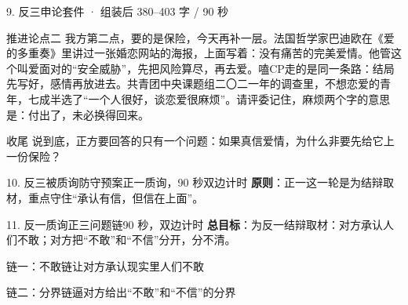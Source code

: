 \documentclass[script,con]{debate}
\begin{document}
\begin{kit}{9. 反三申论}{套件 · 组装后 380–403 字 / 90 秒}
\begin{fixed}{推进论点二}
我方第二点，要的是保险，今天再补一层。法国哲学家巴迪欧在《爱的多重奏》里讲过一张婚恋网站的海报，上面写着：没有痛苦的完美爱情。他管这个叫爱面对的“安全威胁”，先把风险算尽，再去爱。嗑CP走的是同一条路：结局先写好，感情再放进去。共青团中央课题组二〇二一年的调查里，不想恋爱的青年，七成半选了“一个人很好，谈恋爱很麻烦”。请评委记住，麻烦两个字的意思是：付出了，未必换得回来。
\end{fixed}
\begin{fixed}{收尾}
说到底，正方要回答的只有一个问题：如果真信爱情，为什么非要先给它上一份保险？
\end{fixed}
\end{kit}

\begin{stage}{10. 反三被质询防守预案}{正一质询，90 秒双边计时}
\textbf{原则}：正一这一轮是为结辩取材，重点守住“承认有信，但信在上面”。
\begin{qa}
\end{qa}
\end{stage}

\begin{stage}{11. 反一质询正三问题链}{90 秒，双边计时}
\textbf{总目标}：为反一结辩取材：对方承认人们不敢；对方把“不敢”和“不信”分开，分不清。
\begin{chain}{链一：不敢链}{让对方承认现实里人们不敢}
\end{chain}
\begin{chain}{链二：分界链}{逼对方给出“不敢”和“不信”的分界}
\end{chain}
\end{stage}
\end{document}

